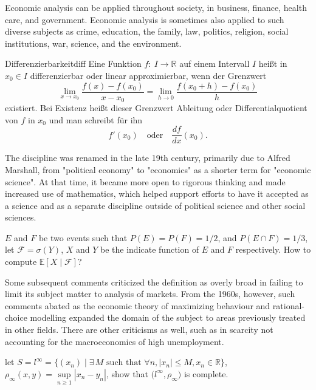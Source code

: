 \documentclass{elegantbook}
\begin{document}
Economic analysis can be applied throughout society, in business, finance, health care, and government. Economic analysis is sometimes also applied to such diverse subjects as crime, education, the family, law, politics, religion, social institutions, war, science, and the environment.

\begin{definition}{Differenzierbarkeit}{diff}
Eine Funktion $f:~I\to\mathbb{R}$ auf einem Intervall $I$ hei\ss{}t in $x_0\in I$ differenzierbar oder linear approximierbar, wenn der Grenzwert
   \begin{equation*}
      \lim\limits_{x\to x_0}\frac{f(x)-f(x_0)}{x-x_0}=
      \lim\limits_{h\to 0}\frac{f(x_0+h)-f(x_0)}{h}
   \end{equation*}
existiert. Bei Existenz hei\ss{}t dieser Grenzwert Ableitung oder Differentialquotient von $f$ in $x_0$ und man schreibt f\"{u}r ihn
   \begin{equation*}
      f'(x_0)\quad\text{oder}\quad\frac{df}{dx}(x_0).
   \end{equation*}
\end{definition}

The discipline was renamed in the late 19th century, primarily due to Alfred Marshall, from "political economy" to "economics" as a shorter term for "economic science". At that time, it became more open to rigorous thinking and made increased use of mathematics, which helped support efforts to have it accepted as a science and as a separate discipline outside of political science and other social sciences.

\begin{example}
$E$ and $F$ be two events such that $P(E)=
P(F)=1/2$, and $P(E\cap F)=1/3$, let $\mathscr{F}=\sigma(Y)$,  $X$ and $Y$ be the indicate function of $E$ and $F$ respectively. How to compute $\mathbb{E}[ X\mid \mathscr{F} ]$?
\end{example}

Some subsequent comments criticized the definition as overly broad in failing to limit its subject matter to analysis of markets. From the 1960s, however, such comments abated as the economic theory of maximizing behaviour and rational-choice modelling expanded the domain of the subject to areas previously treated in other fields. There are other criticisms as well, such as in scarcity not accounting for the macroeconomics of high unemployment.

\begin{exercise}
let $S=l^\infty=\big\{(x_n)\mid \exists\, M \text{ such that } \forall n, |x_n|\leq M,x_n\in \mathbb{R}\big\}$, $\rho_{\infty}(x,y)=\sup\limits_{n\geq 1}|x_n-y_n|$, show that $\big(l^\infty,\rho_{\infty}\big)$ is complete.
\end{exercise}
\end{document}
